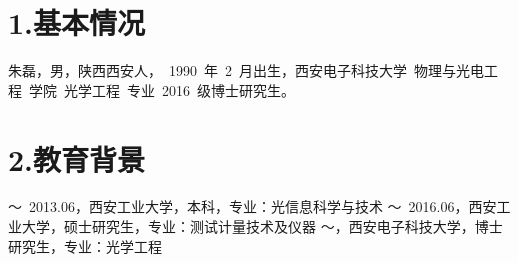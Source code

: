 
\begin{resume}

\section*{1.\hspace{0.75em}基本情况}
朱磊，男，陕西西安人，~1990~年~2~月出生，西安电子科技大学~物理与光电工程~学院~光学工程~专业~2016~级博士研究生。
\section*{2.\hspace{0.75em}教育背景}
\begin{resumelist*}
～~2013.06，西安工业大学，本科，专业：光信息科学与技术
～~2016.06，西安工业大学，硕士研究生，专业：测试计量技术及仪器
～\hspace{3.5em}，西安电子科技大学，博士研究生，专业：光学工程
\end{resumelist*}


\end{resume}
